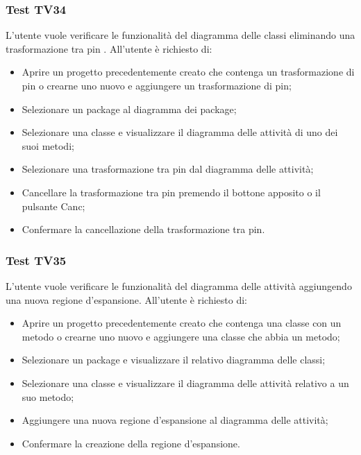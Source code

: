 \documentclass[../PianoDiQualifica.tex]{subfiles}
\begin{document}
	\subsubsection{Test TV34} 
	L'utente vuole verificare le funzionalità del diagramma delle classi eliminando una trasformazione tra pin . 
	All'utente è richiesto di: 
	\begin{itemize} 
		\item Aprire un progetto precedentemente creato che contenga un trasformazione di pin o crearne uno nuovo e aggiungere un trasformazione di pin;
		\item Selezionare un package al diagramma dei package; 
		\item Selezionare una classe e visualizzare il diagramma delle attività di uno dei suoi metodi; 
		\item Selezionare una trasformazione tra pin dal diagramma delle attività; 
		\item Cancellare la trasformazione tra pin premendo il bottone apposito o il pulsante Canc; 
		\item Confermare la cancellazione della trasformazione tra pin. 
	\end{itemize} 
	
	
	
	\subsubsection{Test TV35} 
	L'utente vuole verificare le funzionalità del diagramma delle attività aggiungendo una nuova regione d'espansione. 
	All'utente è richiesto di: 
	\begin{itemize} 
		\item Aprire un progetto precedentemente creato che contenga una classe con un metodo o crearne uno nuovo e aggiungere una classe che abbia un metodo;
		\item Selezionare un package e visualizzare il relativo diagramma delle classi; 
		\item Selezionare una classe e visualizzare il diagramma delle attività relativo a un suo metodo; %
		\item Aggiungere una nuova  regione d'espansione al diagramma delle attività; 
		\item Confermare la creazione della regione d'espansione.%
	\end{itemize} 
	
\end{document}
